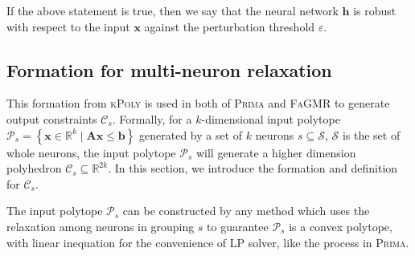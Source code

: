 \documentclass[runningheads]{llncs}
\newcommand{\ourtool}{\textsc{FaGMR}\xspace}
\newcommand{\prima}{\textsc{Prima}\xspace}
\newcommand{\krelu}{\textsc{kPoly}\xspace}
\newcommand{\myvec}[1]{\boldsymbol{#1}}
\newcommand{\mymatrix}[1]{\boldsymbol{#1}}
\begin{document}
If the above statement is true, then we say that the neural network
$\myvec{h}$ is robust with respect to the input $\myvec{x}$ against
the perturbation threshold $\varepsilon$.

%
%
%

\subsection{Formation for multi-neuron relaxation}\label{Subsec3.2}

This formation from \krelu is used in both of \prima and \ourtool to generate output constraints $\mathcal{C}_{s}$.
Formally, for a $k$-dimensional input polytope $\mathcal{P}_{s}=\left \{\myvec{x} \in \mathbb{R}^{k}\mid \mymatrix{A}\myvec{x}\leq \myvec{b}\right\}$ generated by a set of $k$ neurons $s\subseteq \mathcal{S}$, $\mathcal{S}$ is the set of whole neurons,
 the input polytope $\mathcal{P}_{s}$ will generate a higher dimension polyhedron $\mathcal{C}_{s} \subseteq \mathbb{R}^{2k}$.
In this section, we introduce the formation and definition for $\mathcal{C}_{s}$.

The input polytope $\mathcal{P}_{s}$ can be constructed by any method which uses the relaxation among neurons in grouping $s$ to guarantee $\mathcal{P}_{s}$ is a convex polytope, with linear inequation for the  convenience of LP solver, like the process in \prima.  
\end{document}
